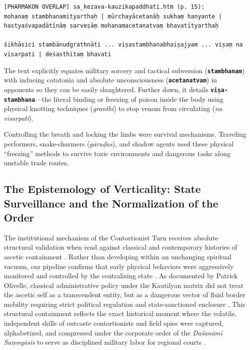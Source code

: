 \documentclass[11pt,letterpaper]{article}
\begin{document}
\begin{lstlisting}[basicstyle=\ttfamily\scriptsize]
[PHARMAKON OVERLAP] sa_kezava-kauzikapaddhati.htm (p. 15):
mohanaṃ stambhanamityarthaḥ | mūrchayācetanāḥ sukhaṃ hanyante | hastyaśvapadātīnāṃ sarveṣāṃ mohanamacetanatvaṃ bhavatītyarthaḥ

śikhāsici stambānudgrathnāti ... viṣastambhanabhaiṣajyam ... viṣaṃ na visarpati | deśasthitaṃ bhavati
\end{lstlisting}

The text explicitly equates military sorcery and tactical subversion (\textbf{\texttt{stambhanam}}) with inducing catatonia and absolute unconsciousness (\textbf{\texttt{acetanatvam}}) in opponents so they can be easily slaughtered. Further down, it details \textbf{\texttt{viṣa-stambhana}}---the literal binding or freezing of poison inside the body using physical knotting techniques (\textit{granthi}) to stop venom from circulating (\textit{na visarpati}). 

Controlling the breath and locking the limbs were survival mechanisms. Traveling performers, snake-charmers (\textit{gāruḍas}), and shadow agents used these physical ``freezing'' methods to survive toxic environments and dangerous tasks along unstable trade routes.

\subsection{The Epistemology of Verticality: State Surveillance and the Normalization of the Order}

The institutional mechanism of the Contortionist Turn receives absolute structural validation when read against classical and contemporary histories of ascetic containment \cite{Clark2006, Olivelle1987}. Rather than developing within an unchanging spiritual vacuum, our pipeline confirms that early physical behaviors were aggressively monitored and controlled by the centralizing state \cite{Olivelle1987, Olivelle2011}. As documented by Patrick Olivelle, classical administrative policy under the Kautilyan matrix did not treat the ascetic self as a transcendent entity, but as a dangerous vector of fluid border mobility requiring strict political regulation and state-sanctioned enclosure \cite{Olivelle1987, Olivelle2011}. This structural containment reflects the exact historical moment where the volatile, independent skills of outcaste contortionists and field spies were captured, alphabetized, and compressed under the corporate order of the \textit{Daśanāmī Saṃnyāsīs} to serve as disciplined military labor for regional courts \cite{Clark2006, Clark2018}.
\end{document}
